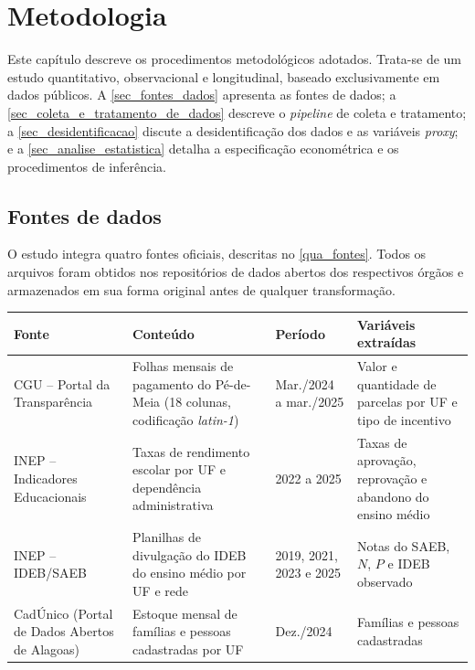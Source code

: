
\chapter{Metodologia}
\label{chap_metodologia}

Este capítulo descreve os procedimentos metodológicos adotados.
Trata-se de um estudo quantitativo, observacional e longitudinal, baseado exclusivamente em dados públicos.
A \autoref{sec_fontes_dados} apresenta as fontes de dados; a \autoref{sec_coleta_e_tratamento_de_dados} descreve o \textit{pipeline} de coleta e tratamento; a \autoref{sec_desidentificacao} discute a desidentificação dos dados e as variáveis \textit{proxy}; e a \autoref{sec_analise_estatistica} detalha a especificação econométrica e os procedimentos de inferência.

\section{Fontes de dados}
\label{sec_fontes_dados}

O estudo integra quatro fontes oficiais, descritas no \autoref{qua_fontes}.
Todos os arquivos foram obtidos nos repositórios de dados abertos dos respectivos órgãos e armazenados em sua forma original antes de qualquer transformação.

\begin{quadro}[!htb]
    \centering
    \caption{Fontes de dados utilizadas}
    \label{qua_fontes}
    \footnotesize
    \begin{tabular}{|p{3.0cm}|p{4.6cm}|p{2.2cm}|p{4.2cm}|}
        \hline
        \textbf{Fonte} & \textbf{Conteúdo} & \textbf{Período} & \textbf{Variáveis extraídas} \\
        \hline
        CGU -- Portal da Transparência & Folhas mensais de pagamento do Pé-de-Meia (18 colunas, codificação \textit{latin-1}) & Mar./2024 a mar./2025 & Valor e quantidade de parcelas por UF e tipo de incentivo \\
        \hline
        INEP -- Indicadores Educacionais & Taxas de rendimento escolar por UF e dependência administrativa & 2022 a 2025 & Taxas de aprovação, reprovação e abandono do ensino médio \\
        \hline
        INEP -- IDEB/SAEB & Planilhas de divulgação do IDEB do ensino médio por UF e rede & 2019, 2021, 2023 e 2025 & Notas do SAEB, $N$, $P$ e IDEB observado \\
        \hline
        CadÚnico (Portal de Dados Abertos de Alagoas) & Estoque mensal de famílias e pessoas cadastradas por UF & Dez./2024 & Famílias e pessoas cadastradas \\
        \hline
    \end{tabular}
\end{quadro}

